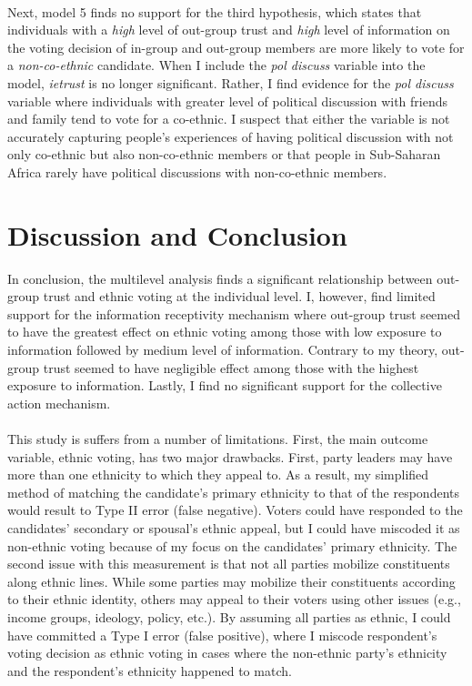 \documentclass[a4paper, 12pt]{article}
\begin{document}
\paragraph{}
Next, model 5 finds no support for the third hypothesis, which states that individuals with a \textit{high} level of out-group trust and \textit{high} level of information on the voting decision of in-group and out-group members are more likely to vote for a \textit{non-co-ethnic} candidate. When I include the \textit{pol discuss} variable into the model, \textit{ietrust} is no longer significant. Rather, I find evidence for the \textit{pol discuss} variable where individuals with greater level of political discussion with friends and family tend to vote for a co-ethnic. I suspect that either the variable is not accurately capturing people's experiences of having political discussion with not only co-ethnic but also non-co-ethnic members or that people in Sub-Saharan Africa rarely have political discussions with non-co-ethnic members. 

\section{Discussion and Conclusion}
In conclusion, the multilevel analysis finds a significant relationship between out-group trust and ethnic voting at the individual level. I, however, find limited support for the information receptivity mechanism where out-group trust seemed to have the greatest effect on ethnic voting among those with low exposure to information followed by medium level of information. Contrary to my theory, out-group trust seemed to have negligible effect among those with the highest exposure to information. Lastly, I find no significant support for the collective action mechanism. 
\paragraph{}
This study is suffers from a number of limitations. First, the main outcome variable, ethnic voting, has two major drawbacks.  First, party leaders may have more than one ethnicity to which they appeal to\cite{adidaSpousalBumpCrossEthnic2016}. As a result, my simplified method of matching the candidate's primary ethnicity to that of the respondents would result to Type II error (false negative). Voters could have responded to the candidates' secondary or spousal's ethnic appeal, but I could have miscoded it as non-ethnic voting because of my focus on the candidates' primary ethnicity. The second issue with this measurement is that not all parties mobilize constituents along ethnic lines. While some parties may mobilize their constituents according to their ethnic identity, others may appeal to their voters using other issues (e.g., income groups, ideology, policy, etc.). By assuming all parties as ethnic, I could have committed a Type I error (false positive), where I miscode respondent's voting decision as ethnic voting in cases where the non-ethnic party's ethnicity and the respondent's ethnicity happened to match. 
\end{document}
